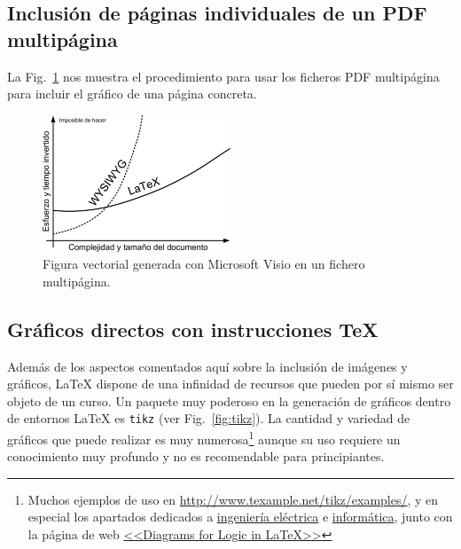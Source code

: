 \documentclass[ 		%
	11pt,				%
	a4paper,			%
	twoside,			%
	openright,			%
	final       		%
]{book}
\begin{document}
\subsection{Inclusión de páginas individuales de un \textsf{PDF} multipágina}
La Fig.~\ref{fig:visio_mp} nos muestra el procedimiento para usar los ficheros \textsf{PDF} multipágina para incluir el gráfico de una página concreta.

\begin{figure}[hbt]
	\centering
	\includegraphics[page=2,width=0.5\textwidth]{visio_mp} 
	\caption[Gráfico de Visio multipágina]{Figura vectorial generada con Microsoft Visio en un fichero multipágina.}
	\label{fig:visio_mp}
\end{figure}



\subsection{Gráficos directos con instrucciones \TeX}
Además de los aspectos comentados aquí sobre la inclusión de imágenes y gráficos, \LaTeX{} dispone de una infinidad de recursos que pueden por sí mismo ser objeto de un curso. Un paquete muy poderoso en la generación de gráficos dentro de entornos \LaTeX{} es \texttt{tikz} (ver Fig.~\ref{fig:tikz}). La cantidad y variedad de gráficos que puede realizar es muy numerosa\footnote{Muchos ejemplos de uso en \url{http://www.texample.net/tikz/examples/}, y en especial los apartados dedicados a \href{http://www.texample.net/tikz/examples/area/electrical-engineering/}{ingeniería eléctrica} e \href{http://www.texample.net/tikz/examples/area/computer-science/}{informática}, junto con la página de web \href{https://www.kleemans.ch/diagrams-for-logic-in-latex}{<<Diagrams for Logic in \LaTeX>>}} aunque su uso requiere un conocimiento muy profundo y no es recomendable para principiantes.
\end{document}
